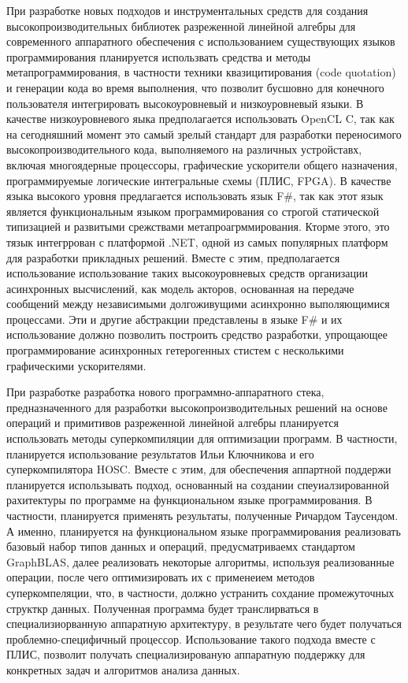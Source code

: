 \documentclass[12pt]{article}  %
\theoremstyle{remark}
\begin{document}
При разработке новых подходов и инструментальных средств для создания высокопроизводительных библиотек разреженной линейной алгебры для современного аппаратного обеспечения с использованием существующих языков программирования планируется использвать средства и методы метапрограммирования, в частности техники квазицитирования (code quotation) и генерации кода во время выполнения, что позволит бусшовно для конечного пользователя интегрировать высокоуровневый и низкоуровневый языки. В качестве низкоуровневого яыка предполагается использовать OpenCL C, так как на сегодняшний момент это самый зрелый стандарт для разработки переносимого высокопроизводительного кода, выполняемого на различных устройставх, включая многоядерные процессоры, графические ускорители общего назначения, программируемые логические интегральные схемы (ПЛИС, FPGA). В качестве языка высокого уровня предлагается использовать язык F\#, так как этот язык является функциональным языком программирования со строгой статической типизацией и развитыми срежствами метапроагрммирования. Кторме этого, это тязык интегррован с платформой .NET, одной из самых популярных платформ для разработки прикладных решений. Вместе с этим, предполагается использование использование таких высокоуровневых средств организации асинхронных высчислений, как модель акторов, основанная на передаче сообщений между независимыми долгоживущими асинхронно выполяющимися процессами. Эти и другие абстракции представлены в языке F\# и их использование должно позволить построить средство разработки, упрощающее программирование асинхронных гетерогенных стистем с несколькими графическими ускорителями.


При разработке разработка нового программно-аппаратного стека, предназначенного для разработки высокопроизводительных решений на основе операций и примитивов разреженной линейной алгебры планируется использовать методы суперкомпиляции для оптимизации программ. В частности, планируется использование результатов Ильи Ключникова и его суперкомпилятора HOSC. Вместе с этим, для обеспечения аппартной поддержи планируется использывать подход, основанный на создании спеуиалзированной рахитектуры по программе на функциональном языке программирования. В частности, планируется применять результаты, полученные Ричардом Таусендом. А именно, планируется на функциональном языке программирования реализовать базовый набор типов данных и операций, предусматриваемх стандартом GraphBLAS, далее реализовать некоторые алгоритмы, используя реализованные операции, после чего оптимизировать их с применеием методов суперкомпеляции, что, в частности, должно устранить сохдание промежуточных структкр данных. Полученная программа будет транслирваться в специализиорванную аппаратную архитектуру, в результате чего будет получаться проблемно-специфичный процессор. Использование такого подхода вместе с ПЛИС, позволит получать специализированую аппаратную поддержку для конкретных задач и алгоритмов анализа данных.
\end{document}
